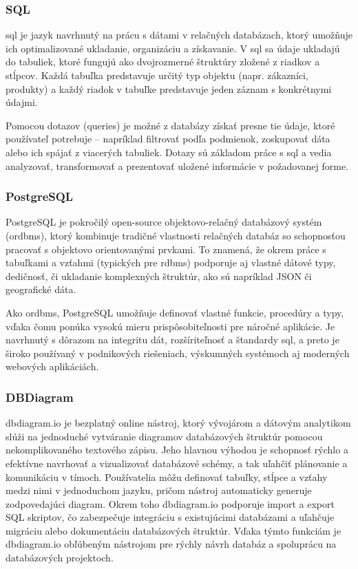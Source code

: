  \subsubsection*{SQL}
 \acrfull{sql} je jazyk navrhnutý na prácu s dátami v relačných databázach, ktorý umožňuje ich optimalizované ukladanie, organizáciu a získavanie.
 V \acrshort{sql} sa údaje ukladajú do tabuliek, ktoré fungujú ako dvojrozmerné štruktúry zložené z riadkov a stĺpcov. 
 Každá tabuľka predstavuje určitý typ objektu (napr. zákazníci, produkty) a každý riadok v tabuľke predstavuje jeden záznam s konkrétnymi údajmi.
 
 Pomocou dotazov (queries) je možné z databázy získať presne tie údaje, ktoré používateľ potrebuje – napríklad filtrovať podľa podmienok, zoskupovať dáta alebo ich spájať z viacerých tabuliek.
 Dotazy sú základom práce s \acrshort{sql} a vedia analyzovať, transformovať a prezentovať uložené informácie v požadovanej forme.\cite{sql}
 
 \subsubsection*{PostgreSQL}
 PostgreSQL je pokročilý open-source objektovo-relačný databázový systém (\acrshort{ordbms}), ktorý kombinuje tradičné vlastnosti relačných databáz so schopnosťou pracovať s objektovo orientovanými prvkami. 
 To znamená, že okrem práce s tabuľkami a vzťahmi (typických pre \acrfull{rdbms}) podporuje aj vlastné dátové typy, dedičnosť, či ukladanie komplexných štruktúr, ako sú napríklad JSON či geografické dáta.
 
 Ako \acrshort{ordbms}, PostgreSQL umožňuje definovať vlastné funkcie, procedúry a typy, vďaka čomu ponúka vysokú mieru prispôsobiteľnosti pre náročné aplikácie. 
 Je navrhnutý s dôrazom na integritu dát, rozšíriteľnosť a štandardy \acrshort{sql}, a preto je široko používaný v podnikových riešeniach, výskumných systémoch aj moderných webových aplikáciách.\cite{postgre}
 \subsubsection*{DBDiagram}
 dbdiagram.io je bezplatný online nástroj, ktorý vývojárom a dátovým analytikom slúži na jednoduché vytváranie diagramov databázových štruktúr pomocou nekomplikovaného textového zápisu.
 Jeho hlavnou výhodou je schopnosť rýchlo a efektívne navrhovať a vizualizovať databázové schémy, a tak uľahčiť plánovanie a komunikáciu v tímoch.
 Používatelia môžu definovať tabuľky, stĺpce a vzťahy medzi nimi v jednoduchom jazyku, pričom nástroj automaticky generuje zodpovedajúci diagram.
 Okrem toho dbdiagram.io podporuje import a export SQL skriptov, čo zabezpečuje integráciu s existujúcimi databázami a uľahčuje migráciu alebo dokumentáciu databázových štruktúr.
 Vďaka týmto funkciám je dbdiagram.io obľúbeným nástrojom pre rýchly návrh databáz a spoluprácu na databázových projektoch.
